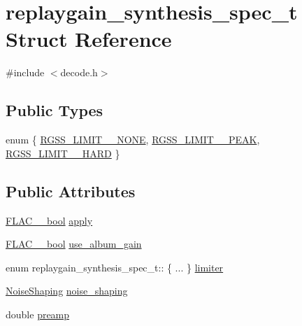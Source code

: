 \hypertarget{structreplaygain__synthesis__spec__t}{}\section{replaygain\+\_\+synthesis\+\_\+spec\+\_\+t Struct Reference}
\label{structreplaygain__synthesis__spec__t}


{\ttfamily \#include $<$decode.\+h$>$}

\subsection*{Public Types}
\begin{DoxyCompactItemize}
\item 
enum \{ \hyperlink{structreplaygain__synthesis__spec__t_a2bfc2695f3013622d17969ebc31a993aa025f513dc8c29934fe6649a8bbeb7b90}{R\+G\+S\+S\+\_\+\+L\+I\+M\+I\+T\+\_\+\+\_\+\+N\+O\+NE}, 
\hyperlink{structreplaygain__synthesis__spec__t_a2bfc2695f3013622d17969ebc31a993aa7419c376502439be6cb6ed1ead912bc8}{R\+G\+S\+S\+\_\+\+L\+I\+M\+I\+T\+\_\+\+\_\+\+P\+E\+AK}, 
\hyperlink{structreplaygain__synthesis__spec__t_a2bfc2695f3013622d17969ebc31a993aafa5658de951aaeaaac52764a7dfb7447}{R\+G\+S\+S\+\_\+\+L\+I\+M\+I\+T\+\_\+\+\_\+\+H\+A\+RD}
 \}
\end{DoxyCompactItemize}
\subsection*{Public Attributes}
\begin{DoxyCompactItemize}
\item 
\hyperlink{ordinals_8h_a95103469f1cbd78b8cf250194985b34e}{F\+L\+A\+C\+\_\+\+\_\+bool} \hyperlink{structreplaygain__synthesis__spec__t_a7a6f8e7d818b3b022df0af9c258b657d}{apply}
\item 
\hyperlink{ordinals_8h_a95103469f1cbd78b8cf250194985b34e}{F\+L\+A\+C\+\_\+\+\_\+bool} \hyperlink{structreplaygain__synthesis__spec__t_a9e33ee4f9518f652c890b5daca373aa4}{use\+\_\+album\+\_\+gain}
\item 
enum replaygain\+\_\+synthesis\+\_\+spec\+\_\+t\+:: \{ ... \}  \hyperlink{structreplaygain__synthesis__spec__t_a72c08d263b3fb5a1c9bfcf45ed189c38}{limiter}
\item 
\hyperlink{replaygain__synthesis_8h_ac9742b8037806648f7cf5e6ab62a42df}{Noise\+Shaping} \hyperlink{structreplaygain__synthesis__spec__t_a9554b9cb873391212e2e23bb0bbf8bca}{noise\+\_\+shaping}
\item 
double \hyperlink{structreplaygain__synthesis__spec__t_a3966f7fdc85242f3608dc15a4823995d}{preamp}
\end{DoxyCompactItemize}


